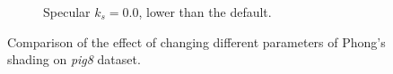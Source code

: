 \documentclass[a4paper]{article}
\begin{document}
\begin{figure}[h]
\begin{subfigure}[b]{0.45\textwidth}
    \caption{Specular $k_s=0.0$, lower than the default.}
  \end{subfigure}
  \caption{Comparison of the effect of changing different parameters of Phong's shading on \textit{pig8} dataset.}
  \label{fig:phong}
\end{figure}
\end{document}
